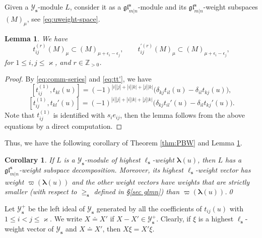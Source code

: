\documentclass[11pt,reqno]{amsart}
\numberwithin{equation}{section}
\newtheorem{lem}[thm]{Lemma}
\newtheorem{cor}[thm]{Corollary}
\theoremstyle{definition}
\theoremstyle{remark}
\newcommand{\beq}{\begin{equation}}
\newcommand{\eeq}{\end{equation}}
\newcommand{\bZ}{\mathbb{Z}}
\newcommand{\gge}{\geqslant}
\newcommand{\lle}{\leqslant}
\newcommand{\bla}{\bm\lambda}
\newcommand{\glMN}{\mathfrak{gl}_{m|n}^{\bm s}}
\newcommand{\YglMN}{\mathscr{Y}_{\bm s}}
\newcommand{\YMN}{{\mathscr{Y}_{\bm s}}}
\newcommand{\YMNp}{{\mathscr{Y}_{\bm s}^+}}
\newcommand{\ka}{\varkappa}
\newcommand{\s}{{\bm s}}
\begin{document}
Given a $\YglMN$-module $L$, consider it as a $\glMN$-module and its $\glMN$-weight subspaces $(M)_{\mu}$, see \eqref{eq:uweight-space}.
\begin{lem}\label{lem:wt-change}
We have
\[
t_{ij}^{(r)}(M)_{\mu}\subset (M)_{\mu+\epsilon_i-\epsilon_j},\qquad t_{ij}^{\prime (r)}(M)_{\mu}\subset (M)_{\mu+\epsilon_i-\epsilon_j},
\]
for $1\lle i, j\lle \ka$, and $r\in\bZ_{>0}$.
\end{lem}
\begin{proof}
By \eqref{eq:comm-series} and \eqref{eq:tt'}, we have
\beq\label{eq:1st-node-tt}
[t_{ij}^{(1)},t_{kl}(u)]=(-1)^{|i||j|+|i||k|+|j||k|}\big(\delta_{kj}t_{il}(u)-\delta_{il}t_{kj}(u)\big),
\eeq
\beq\label{eq:1st-node-tt'}
[t_{ij}^{(1)},t_{kl}'(u)]=(-1)^{|i||j|+|i||k|+|j||k|}\big(\delta_{kj}t_{il}'(u)-\delta_{il}t_{kj}'(u)\big).
\eeq
Note that $t_{ij}^{(1)}$ is identified with $s_ie_{ij}$, then the lemma follows from the above equations by a direct computation.
\end{proof}

Thus, we have the following corollary of Theorem \ref{thm:PBW} and Lemma \ref{lem:wt-change}.
\begin{cor}
If $L$ is a $\YMN$-module of highest $\ell_\s$-weight $\bla(u)$, then $L$ has a $\glMN$-weight subspace decomposition. Moreover, its highest $\ell_\s$-weight vector has weight $\varpi(\bla(u))$ and the other weight vectors have weights that are strictly smaller (with respect to $\gge_{\s}$ defined in \S \ref{sec glmn}) than $\varpi(\bla(u))$.\qed
\end{cor}


Let $\YMNp$ be the left ideal of $\YMN$ generated by all the coefficients of $t_{ij}(u)$ with $1\lle i<j\lle \ka$. We write $X\doteq X'$ if $X-X'\in \YMNp$. Clearly, if $\xi$ is a highest $\ell_\s$-weight vector of $\YMN$ and $X\doteq X'$, then $X\xi=X'\xi$.
\end{document}
